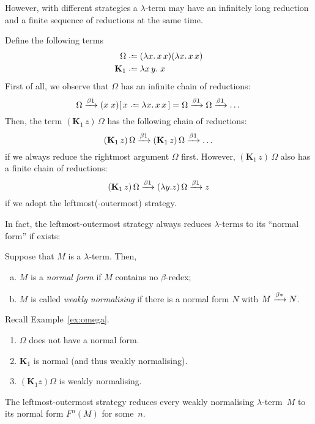However, with different strategies a $\lambda$-term may have an infinitely long
reduction and a finite sequence of reductions at the same time. 
\begin{example} \label{ex:omega}
  Define the following terms
  \begin{align*}
    \Omega &\defeq (\lambda x.\, x\,x)(\lambda x.\,x\,x) \\
    \mathbf{K}_1 & \defeq \lambda x\,y.\;x
  \end{align*}
  First of all, we observe that $\Omega$ has an infinite chain of reductions:
  \[
    \Omega \onereduce (x\;x)\subst{x}{\lambda x.\, x\,x} = \Omega 
    \onereduce\Omega \onereduce \dots 
  \]
  Then, the term $(\mathbf{K}_1\,z)\,\Omega$ has the following
  chain of reductions:
  \[
    (\mathbf{K}_1\,z)\,\Omega
    \xrightarrow{\beta1} 
    (\mathbf{K}_1\,z)\,\Omega
    \xrightarrow{\beta1} \dots
  \]
  if we always reduce the rightmost argument $\Omega$ first.
  However, $(\mathbf{K}_1\,z)\,\Omega$ also has a finite chain of reductions:
  \[
    (\mathbf{K}_1\,z)\,\Omega
    \xrightarrow{\beta1} (\lambda y. z)\,\Omega
    \xrightarrow{\beta1} z
  \]
  if we adopt the leftmost(-outermost) strategy.
\end{example}
In fact, the leftmost-outermost strategy always reduces $\lambda$-terms to its
``normal form'' if exists:
\begin{definition}
  Suppose that $M$ is a $\lambda$-term. Then, 
  \begin{enumerate}[(a)]
    \item $M$ is a \emph{normal form} if $M$ contains no $\beta$-redex;
    \item $M$ is called \emph{weakly normalising} if there is a normal form
      $N$ with $M \xrightarrow{\beta*} N$.
  \end{enumerate}
\end{definition}

\begin{example}
  Recall Example~\ref{ex:omega}. 
  \begin{enumerate}
    \item $\Omega$ does not have a normal form.
    \item $\mathbf{K}_1$ is normal (and thus weakly normalising).
    \item $(\mathbf{K}_1 z) \Omega$ is weakly normalising.
  \end{enumerate}
\end{example}

\begin{theorem}
  The leftmost-outermost strategy reduces every weakly
  normalising $\lambda$-term~$M$ to its normal form $F^n(M)$ for some~$n$.
\end{theorem}

